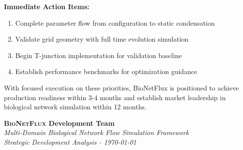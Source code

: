 \documentclass[11pt,a4paper]{article}
\newcommand{\bionetflux}{\textsc{BioNetFlux}}
\begin{document}
\textbf{Immediate Action Items:}
\begin{enumerate}
    \item Complete parameter flow from configuration to static condensation
    \item Validate grid geometry with full time evolution simulation  
    \item Begin T-junction implementation for validation baseline
    \item Establish performance benchmarks for optimization guidance
\end{enumerate}

With focused execution on these priorities, BioNetFlux is positioned to achieve production readiness within 3-4 months and establish market leadership in biological network simulation within 12 months.

\vspace{2cm}

\begin{center}
\textbf{\bionetflux{} Development Team} \\
\textit{Multi-Domain Biological Network Flow Simulation Framework} \\
\textit{Strategic Development Analysis - \today}
\end{center}
\end{document}
